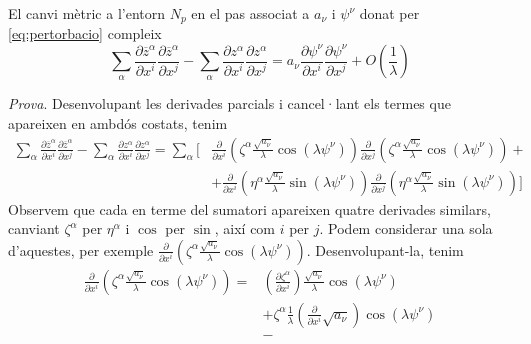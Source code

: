 \begin{prop}\label{prop:mida_pertorbacio}
    El canvi mètric a l'entorn $N_p$ en el pas associat a $a_\nu$ i $\psi^\nu$ donat per \ref{eq:pertorbacio} compleix
    \begin{equation}\label{eq:pertorbacio_cota}
        \sum_\alpha\frac{\partial\overline{z}^\alpha}{\partial x^i}\frac{\partial\overline{z}^\alpha}{\partial x^j}-\sum_\alpha\frac{\partial z^\alpha}{\partial x^i}\frac{\partial z^\alpha}{\partial x^j} =  a_\nu \frac{\partial\psi^\nu}{\partial x^i}\frac{\partial\psi^\nu}{\partial x^j} + O\left(\frac1\lambda\right)
    \end{equation}
\end{prop}

{\color{green!50!black}\textit{Prova}. Desenvolupant les derivades parcials i cancel·lant els termes que apareixen en ambdós costats, tenim
\begin{align}\label{eq:pertorbacio_descomp}
    \nonumber\sum_\alpha\frac{\partial\overline{z}^\alpha}{\partial x^i}\frac{\partial\overline{z}^\alpha}{\partial x^j}-\sum_\alpha\frac{\partial z^\alpha}{\partial x^i}\frac{\partial z^\alpha}{\partial x^j}
    =
    \sum_{\alpha}\Bigg[ &\frac{\partial}{\partial x^i}\left( \zeta^\alpha\frac{\sqrt{a_\nu}}{\lambda}\cos(\lambda \psi^\nu)\right) \frac{\partial}{\partial x^j}\left( \zeta^\alpha\frac{\sqrt{a_\nu}}{\lambda}\cos(\lambda \psi^\nu)\right) +
    \\
    &+ \frac{\partial}{\partial x^i}\left( \eta^\alpha\frac{\sqrt{a_\nu}}{\lambda}\sin(\lambda \psi^\nu)\right) \frac{\partial}{\partial x^j}\left( \eta^\alpha\frac{\sqrt{a_\nu}}{\lambda}\sin(\lambda \psi^\nu)\right)
    \Bigg]
\end{align}
Observem que cada en terme del sumatori apareixen quatre derivades similars, canviant $\zeta^\alpha$ per $\eta^\alpha$ i $\cos$ per $\sin$, així com $i$ per $j$. Podem considerar una sola d'aquestes, per exemple $\frac{\partial}{\partial x^i}\left( \zeta^\alpha\frac{\sqrt{a_\nu}}{\lambda}\cos(\lambda \psi^\nu)\right)$. Desenvolupant-la, tenim
\begin{align*}
    \frac{\partial}{\partial x^i}\left( \zeta^\alpha\frac{\sqrt{a_\nu}}{\lambda}\cos(\lambda \psi^\nu)\right)
    =&
    \left(\frac{\partial \zeta^\alpha}{\partial x^i} \right)\frac{\sqrt{a_\nu}}{\lambda}\cos(\lambda \psi^\nu) 
    \\&+ 
    \zeta^\alpha\frac{1}{\lambda}\left(\frac{\partial}{\partial x^i}\sqrt{a_\nu}\right) \cos(\lambda \psi^\nu)
    \\&-

\end{align*}}

